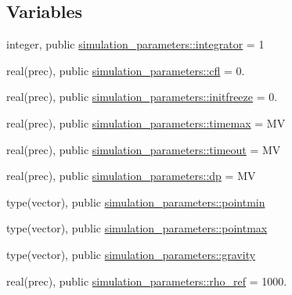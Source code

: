 \subsection*{Variables}
\begin{DoxyCompactItemize}
\item 
integer, public \mbox{\hyperlink{namespacesimulation__parameters_a0a398ad974eef004e43a347105e8ad81}{simulation\+\_\+parameters\+::integrator}} = 1
\item 
real(prec), public \mbox{\hyperlink{namespacesimulation__parameters_a82ce5585265987eedbbaad0cd9cac673}{simulation\+\_\+parameters\+::cfl}} = 0.
\item 
real(prec), public \mbox{\hyperlink{namespacesimulation__parameters_add65346bea9045d3ea4573be190f7cdc}{simulation\+\_\+parameters\+::initfreeze}} = 0.
\item 
real(prec), public \mbox{\hyperlink{namespacesimulation__parameters_aedd90d7d1a6db61fcac836ac37034e75}{simulation\+\_\+parameters\+::timemax}} = MV
\item 
real(prec), public \mbox{\hyperlink{namespacesimulation__parameters_a70ee14718c33544ce34bf7990211e5cc}{simulation\+\_\+parameters\+::timeout}} = MV
\item 
real(prec), public \mbox{\hyperlink{namespacesimulation__parameters_afe85a1735413a2cc7a220910f68bd214}{simulation\+\_\+parameters\+::dp}} = MV
\item 
type(vector), public \mbox{\hyperlink{namespacesimulation__parameters_acb9016ab495389a3b970541d9ec585cf}{simulation\+\_\+parameters\+::pointmin}}
\item 
type(vector), public \mbox{\hyperlink{namespacesimulation__parameters_ac8471983089d031118d18a4b498d4e0d}{simulation\+\_\+parameters\+::pointmax}}
\item 
type(vector), public \mbox{\hyperlink{namespacesimulation__parameters_a5f4b25aae7394e93796760f8720af525}{simulation\+\_\+parameters\+::gravity}}
\item 
real(prec), public \mbox{\hyperlink{namespacesimulation__parameters_afde4a9da604d884c51389f6fa871e521}{simulation\+\_\+parameters\+::rho\+\_\+ref}} = 1000.
\end{DoxyCompactItemize}
